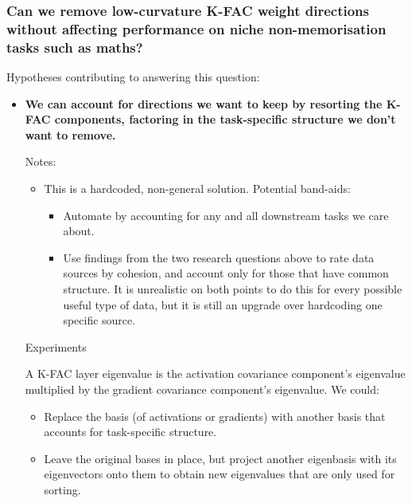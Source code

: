 \documentclass[11pt,a4paper]{article}
\newenvironment{notes}[1][Notes]{%
  \par\vspace{0.2em}#1:%
  \begin{itemize}%
}{%
  \end{itemize}%
}
\newenvironment{experiments}[1][Experiments]{%
  \par\vspace{0.2em}#1\par\vspace{0.1em}%
}{%
  \par%
}
\begin{document}
\subsubsection{Can we remove low-curvature K-FAC weight directions without affecting performance on niche non-memorisation tasks such as maths?}

Hypotheses contributing to answering this question:

\begin{itemize}
  \item \textbf{We can account for directions we want to keep by resorting the K-FAC components, factoring in the task-specific structure we don't want to remove.}
    \begin{notes}
      \item This is a hardcoded, non-general solution. Potential band-aids:
        \begin{itemize}
          \item Automate by accounting for any and all downstream tasks we care about.
          \item Use findings from the two research questions above to rate data sources by cohesion, and account only for those that have common structure. It is unrealistic on both points to do this for every possible useful type of data, but it is still an upgrade over hardcoding one specific source.
        \end{itemize}
    \end{notes}
    \begin{experiments}
    A K-FAC layer eigenvalue is the activation covariance component's eigenvalue multiplied by the gradient covariance component's eigenvalue. We could:
    \begin{itemize}
      \item Replace the basis (of activations or gradients) with another basis that accounts for task-specific structure.
      \item Leave the original bases in place, but project another eigenbasis with its eigenvectors onto them to obtain new eigenvalues that are only used for sorting.
    \end{itemize}
    \end{experiments}
\end{itemize}
\end{document}
